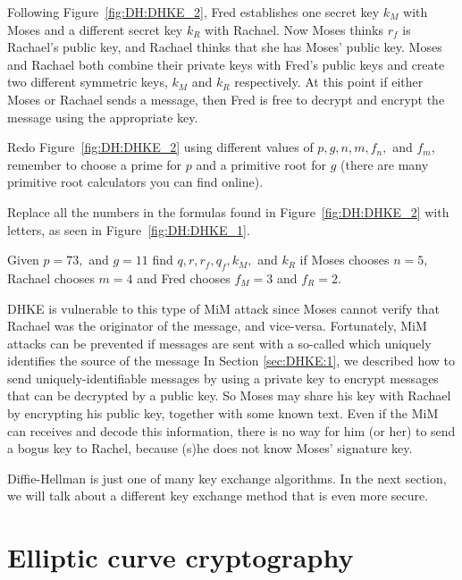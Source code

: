Following Figure~\ref{fig:DH:DHKE_2}, Fred establishes one secret key $k_M$ with Moses and a different secret key $k_R$ with Rachael.  Now Moses thinks $r_f$ is Rachael's public key, and Rachael thinks that she has Moses' public key. Moses and Rachael both combine their private keys with Fred's public keys and create two different symmetric keys, $k_M$ and $k_R$ respectively. At this point if either Moses or Rachael sends a message, then Fred is free to decrypt and encrypt the message using the appropriate key. 

\begin{exercise}{}
Redo Figure~\ref{fig:DH:DHKE_2} using different values of $p, g, n,m, f_n,$ and $f_m$, remember to choose a prime for $p$ and a primitive root for $g$ (there are many primitive root calculators you can find online).
\end{exercise}

\begin{exercise}{}
Replace all the numbers in the formulas found in Figure~\ref{fig:DH:DHKE_2} with letters, as seen in Figure~\ref{fig:DH:DHKE_1}.
\end{exercise}

\begin{exercise}{}
Given $p=73,$ and $g=11$ find $q, r, r_f, q_f, k_M,$ and $k_R$ if Moses chooses $n=5$, Rachael chooses $m=4$ and Fred chooses $f_M=3$ and $f_R=2$.
\end{exercise}

DHKE is vulnerable to this type of MiM attack since Moses cannot verify that Rachael was the originator of the message, and vice-versa.  Fortunately,  MiM attacks can be prevented if messages are sent with a so-called  which uniquely identifies the source of the message   In Section \ref{sec:DHKE:1}, we described how to send uniquely-identifiable messages by using a private key to encrypt  messages that can be decrypted by a public key.  So Moses may share his key with Rachael by encrypting his public key, together with some known text. Even if the MiM can receives and decode this information, there is no way for him (or her) to send a bogus key to Rachel, because (s)he does not know Moses' signature key.  

 Diffie-Hellman is just one of many key exchange algorithms. In the next section, we will talk about a different key exchange method that is even more secure.

\section{Elliptic curve cryptography}
\label{sec:FurtherCryptography:EllipticalCurve}

